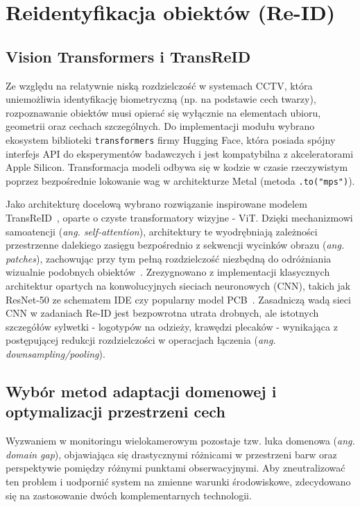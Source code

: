 \section{Reidentyfikacja obiektów (Re-ID)}

\subsection{Vision Transformers i TransReID}

Ze względu na relatywnie niską rozdzielczość w systemach CCTV, która uniemożliwia identyfikację
biometryczną (np. na podstawie cech twarzy), rozpoznawanie obiektów musi opierać się wyłącznie na
elementach ubioru, geometrii oraz cechach szczególnych. Do implementacji modułu wybrano ekosystem
biblioteki \texttt{transformers} firmy Hugging Face, która posiada spójny interfejs API do
eksperymentów badawczych i jest kompatybilna z akceleratorami Apple Silicon. Transformacja modeli
odbywa się w kodzie w czasie rzeczywistym poprzez bezpośrednie lokowanie wag w architekturze Metal
(metoda \texttt{.to("mps")}).

Jako architekturę docelową wybrano rozwiązanie inspirowane modelem
TransReID~\cite{he2021transreid}, oparte o czyste transformatory wizyjne - ViT. Dzięki mechanizmowi
samoatencji (\textit{ang. self-attention}), architektury te wyodrębniają zależności przestrzenne
dalekiego zasięgu bezpośrednio z sekwencji wycinków obrazu (\textit{ang. patches}), zachowując przy
tym pełną rozdzielczość niezbędną do odróżniania wizualnie podobnych
obiektów~\cite{he2021transreid}. Zrezygnowano z implementacji klasycznych architektur opartych na
konwolucyjnych sieciach neuronowych (CNN), takich jak ResNet-50 ze schematem IDE czy popularny
model PCB~\cite{sun2018beyond}. Zasadniczą wadą sieci CNN w zadaniach Re-ID jest bezpowrotna utrata
drobnych, ale istotnych szczegółów sylwetki - logotypów na odzieży, krawędzi plecaków - wynikająca
z postępującej redukcji rozdzielczości w operacjach łączenia (\textit{ang. downsampling/pooling}).

\subsection{Wybór metod adaptacji domenowej i optymalizacji przestrzeni cech}

Wyzwaniem w monitoringu wielokamerowym pozostaje tzw. luka domenowa (\textit{ang. domain gap}),
objawiająca się drastycznymi różnicami w przestrzeni barw oraz perspektywie pomiędzy różnymi
punktami obserwacyjnymi. Aby zneutralizować ten problem i uodpornić system na zmienne warunki
środowiskowe, zdecydowano się na zastosowanie dwóch komplementarnych technologii.

